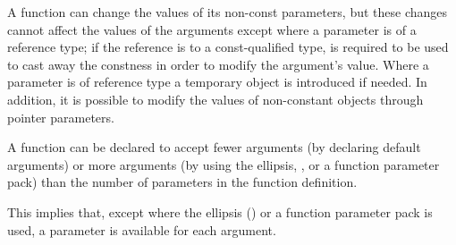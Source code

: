 \pnum
\begin{note}
%
%
%
%
%
%
A function can change the values of its non-const parameters, but these
changes cannot affect the values of the arguments except where a
parameter is of a reference type; if the reference is to
a const-qualified type,  is required to be used to
cast away the constness in order to modify the argument's value. Where a
parameter is of  reference type a temporary object is
introduced if
needed.
In addition, it is possible to modify the values of non-constant objects through
pointer parameters.
\end{note}

\pnum
{}%
%
A function can be declared to accept fewer arguments (by declaring default
arguments) or more arguments (by using the ellipsis,
, or a function parameter pack) than the number of
parameters in the function definition.
\begin{note}
This implies that, except where the ellipsis () or a function
parameter pack is used, a parameter is available for each argument.
\end{note}

